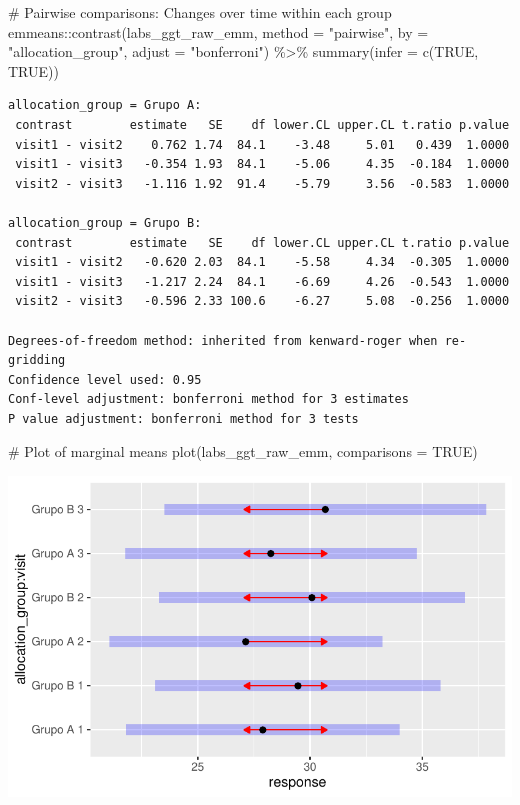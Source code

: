 \documentclass[
  12pt,
]{article}
\newenvironment{Shaded}{\begin{snugshade}}{\end{snugshade}}
\newcommand{\AttributeTok}[1]{\textcolor[rgb]{0.40,0.45,0.13}{#1}}
\newcommand{\CommentTok}[1]{\textcolor[rgb]{0.37,0.37,0.37}{#1}}
\newcommand{\ConstantTok}[1]{\textcolor[rgb]{0.56,0.35,0.01}{#1}}
\newcommand{\FunctionTok}[1]{\textcolor[rgb]{0.28,0.35,0.67}{#1}}
\newcommand{\NormalTok}[1]{\textcolor[rgb]{0.00,0.23,0.31}{#1}}
\newcommand{\SpecialCharTok}[1]{\textcolor[rgb]{0.37,0.37,0.37}{#1}}
\newcommand{\StringTok}[1]{\textcolor[rgb]{0.13,0.47,0.30}{#1}}
\begin{document}
\begin{Shaded}
\begin{Highlighting}[]
\CommentTok{\# Pairwise comparisons: Changes over time within each group}
\NormalTok{emmeans}\SpecialCharTok{::}\FunctionTok{contrast}\NormalTok{(labs\_ggt\_raw\_emm,}
\AttributeTok{method =} \StringTok{"pairwise"}\NormalTok{, }\AttributeTok{by =} \StringTok{"allocation\_group"}\NormalTok{,}
\AttributeTok{adjust =} \StringTok{"bonferroni"}\NormalTok{) }\SpecialCharTok{\%\textgreater{}\%} \FunctionTok{summary}\NormalTok{(}\AttributeTok{infer =} \FunctionTok{c}\NormalTok{(}\ConstantTok{TRUE}\NormalTok{, }\ConstantTok{TRUE}\NormalTok{))}
\end{Highlighting}
\end{Shaded}

\begin{verbatim}
allocation_group = Grupo A:
 contrast        estimate   SE    df lower.CL upper.CL t.ratio p.value
 visit1 - visit2    0.762 1.74  84.1    -3.48     5.01   0.439  1.0000
 visit1 - visit3   -0.354 1.93  84.1    -5.06     4.35  -0.184  1.0000
 visit2 - visit3   -1.116 1.92  91.4    -5.79     3.56  -0.583  1.0000

allocation_group = Grupo B:
 contrast        estimate   SE    df lower.CL upper.CL t.ratio p.value
 visit1 - visit2   -0.620 2.03  84.1    -5.58     4.34  -0.305  1.0000
 visit1 - visit3   -1.217 2.24  84.1    -6.69     4.26  -0.543  1.0000
 visit2 - visit3   -0.596 2.33 100.6    -6.27     5.08  -0.256  1.0000

Degrees-of-freedom method: inherited from kenward-roger when re-gridding 
Confidence level used: 0.95 
Conf-level adjustment: bonferroni method for 3 estimates 
P value adjustment: bonferroni method for 3 tests 
\end{verbatim}

\begin{Shaded}
\begin{Highlighting}[]
\CommentTok{\# Plot of marginal means}
\FunctionTok{plot}\NormalTok{(labs\_ggt\_raw\_emm, }\AttributeTok{comparisons =} \ConstantTok{TRUE}\NormalTok{)}
\end{Highlighting}
\end{Shaded}

\includegraphics{Outcomes_files/figure-pdf/labs_ggt_raw_emm-1.pdf}
\end{document}
